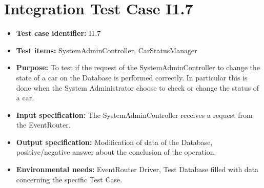 \section{Integration Test Case I1.7}
\begin{itemize}
\item \textbf{Test case identifier:} I1.7
\item \textbf{Test items:} SystemAdminController, CarStatusManager
\item \textbf{Purpose:} To test if the request of the SystemAdminController to change the state of a car on the Database is performed correctly. In particular this is done when the System Administrator choose to check or change the status of a car.
\item \textbf{Input specification:} The SystemAdminController receives a request from the EventRouter.
\item \textbf{Output specification:} Modification of data of the Database, positive/negative answer about the conclusion of the operation.
\item \textbf{Environmental needs:} EventRouter Driver, Test Database filled with data concerning the specific Test Case.
\end{itemize}

